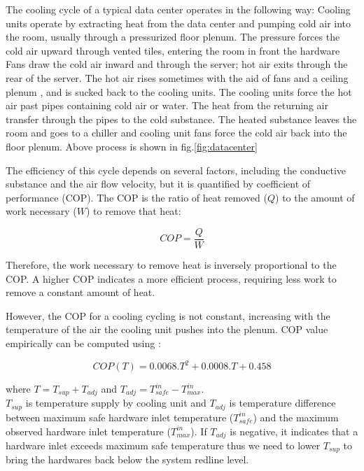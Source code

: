 \documentclass[conference]{IEEEtran}
\begin{document}
The cooling cycle of a typical data center operates in the following way:
Cooling units operate by extracting heat from the data center and pumping cold air into the room, usually through a pressurized floor plenum.
The pressure forces the cold air upward through vented tiles, entering the room in front the hardware
Fans draw the cold air inward and through the server; hot air exits through the rear of the server.
The hot air rises sometimes with the aid of fans and a ceiling plenum , and is sucked back to the cooling units.
The cooling units force the hot air past pipes containing cold air or water. 
The heat from the returning air transfer through the pipes to the cold substance. 
The heated substance leaves the room and goes to a chiller and cooling unit fans force the cold air back into the floor plenum. 
Above process is shown in fig.\ref{fig:datacenter}

The efficiency of this cycle depends on several factors, including the conductive substance and the air flow velocity, but it is quantified by coefficient of performance (COP).
The COP is the ratio of heat removed ($Q$) to the amount of work necessary ($W$) to remove that heat:

\begin{equation}\label{eqn:cop}
	COP=\frac{Q}{W}
\end{equation}

Therefore, the work necessary to remove heat is inversely proportional to the COP.  
A higher COP indicates a more efficient process, requiring less work to remove a constant amount of heat.

However, the COP for a cooling cycling is not constant, increasing with the temperature of the air the cooling unit pushes into the plenum.  
COP value empirically can be computed using \cite{moore2005making}:

\begin{equation}\label{eqn:copt}
	COP(T) = 0.0068.T^2 + 0.0008.T + 0.458
\end{equation}

where $T = T_{sup} + T_{adj}$ and $T_{adj} = T_{safe}^{in}-T_{max}^{in}$. \\
$T_{sup}$ is temperature supply by cooling unit and $T_{adj}$ is temperature difference between maximum safe hardware inlet temperature ($T_{safe}^{in}$) and the maximum observed hardware inlet temperature ($T_{max}^{in}$).
If $T_{adj}$ is negative, it indicates that a hardware inlet exceeds maximum safe temperature thus we need to lower $T_{sup}$ to bring the hardwares back below the system redline level.
\end{document}

